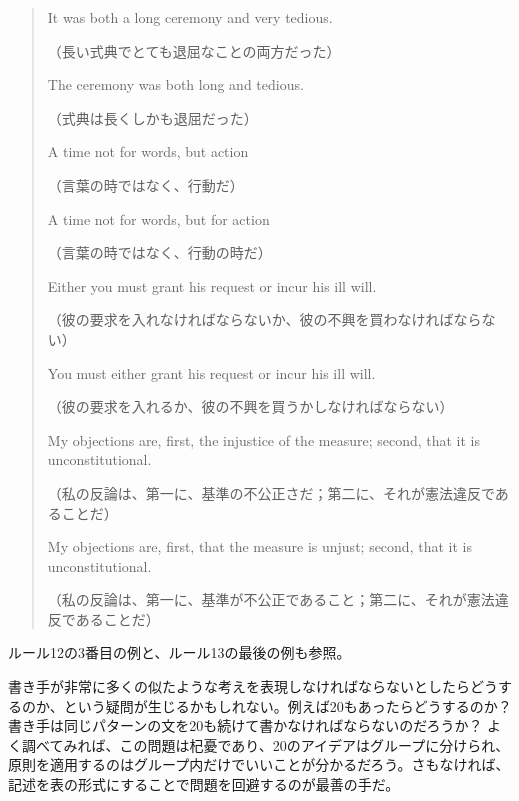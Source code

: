 \begin{quote}
    It was both a long ceremony and very tedious.
    
    （長い式典でとても退屈なことの両方だった）
    
    The ceremony was both long and tedious.
    
    （式典は長くしかも退屈だった）
    
    A time not for words, but action
    
    （言葉の時ではなく、行動だ）
    
    A time not for words, but for action
    
    （言葉の時ではなく、行動の時だ）
    
    Either you must grant his request or incur his ill will.
    
    （彼の要求を入れなければならないか、彼の不興を買わなければならない）
    
    You must either grant his request or incur his ill will.
    
    （彼の要求を入れるか、彼の不興を買うかしなければならない）
    
    My objections are, first, the injustice of the measure; second,
that it is unconstitutional.

（私の反論は、第一に、基準の不公正さだ；第二に、それが憲法違反であることだ）

My objections are, first, that the measure is unjust; second, that
it is unconstitutional.

（私の反論は、第一に、基準が不公正であること；第二に、それが憲法違反であることだ）
\end{quote}
ルール12の3番目の例と、ルール13の最後の例も参照。
\par 書き手が非常に多くの似たような考えを表現しなければならないとしたらどうするのか、という疑問が生じるかもしれない。例えば20もあったらどうするのか？
書き手は同じパターンの文を20も続けて書かなければならないのだろうか？
よく調べてみれば、この問題は杞憂であり、20のアイデアはグループに分けられ、原則を適用するのはグループ内だけでいいことが分かるだろう。さもなければ、記述を表の形式にすることで問題を回避するのが最善の手だ。
